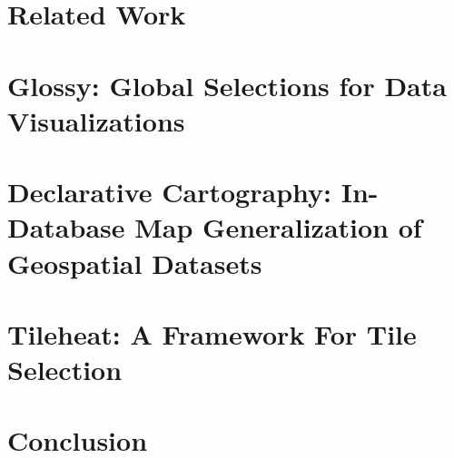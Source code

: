 \documentclass[11pt, oneside]{report}   	%
\begin{document}
\chapter{Related Work}
\chapter{Glossy: Global Selections for Data Visualizations}
\chapter{Declarative Cartography: In-Database Map Generalization of Geospatial Datasets}
\chapter{Tileheat: A Framework For Tile Selection}
\chapter{Conclusion}



\end{document}
